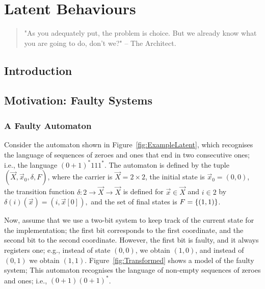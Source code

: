 

\chapter{Latent Behaviours} %
\label{ch:LatentBehaviours} %
\begin{quote} 
"As you adequately put, the problem is choice. But we already know what you are going to do, don't we?" -- The Architect.
\end{quote} 

\section{Introduction}

\section{Motivation: Faulty Systems}

\subsection{A Faulty Automaton}
Consider the automaton shown in Figure~\ref{fig:ExampleLatent}, which recognises the language of sequences of zeroes and ones that end in two consecutive ones; i.e., the language $(0+1)^*111^*$. The automaton is defined by the tuple $(\vec{X},\vec{x}_0,\delta,F)$, where the carrier is $\vec{X}=2\times2$, the initial state is $\vec{x}_0=(0,0)$, the transition function $\delta\colon 2\rightarrow\vec{X}\rightarrow \vec{X}$ is defined for $\vec{x}\in \vec{X}$ and $i \in 2$ by $\delta(i)(\vec{x})=(i,\vec{x}[0]),$ and the set of final states is $F=\left\{(1,1)\right\}$.

Now, assume that we use a two-bit system to keep track of the current state for the implementation; the first bit corresponds to the first coordinate, and the second bit to the second coordinate. However, the first bit is faulty, and it always registers one; e.g., instead of state $(0,0)$, we obtain $(1,0)$, and instead of $(0,1)$ we obtain $(1,1)$. %
Figure~\ref{fig:Transformed} shows a model of the faulty system; %
This automaton recognises the language of non-empty sequences of zeroes and ones; i.e., $(0+1)(0+1)^*$. 

